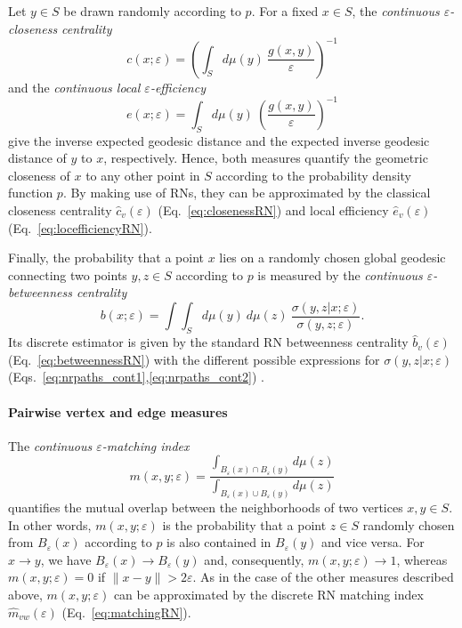 Let $y\in S$ be drawn randomly according to $p$. For a fixed $x\in S$, the \emph{continuous $\varepsilon$-closeness centrality}
\begin{equation}
c(x;\varepsilon)=\left(\int_S d\mu(y)\ \frac{g(x,y)}{\varepsilon}\right)^{-1}
\end{equation}
\noindent
and the \emph{continuous local $\varepsilon$-efficiency} 
\begin{equation}
e(x;\varepsilon)=\int_S d\mu(y)\ \left(\frac{g(x,y)}{\varepsilon}\right)^{-1}
\end{equation}
\noindent
give the inverse expected geodesic distance and the expected inverse geodesic distance of $y$ to $x$, respectively. Hence, both measures quantify the geometric closeness of $x$ to any other point in $S$ according to the probability density function $p$. By making use of RNs, they can be approximated by the classical closeness centrality $\hat{c}_v(\varepsilon)$ (Eq.~\ref{eq:closenessRN}) and local efficiency $\hat{e}_v(\varepsilon)$ (Eq.~\ref{eq:locefficiencyRN}).

Finally, the probability that a point $x$ lies on a randomly chosen global geodesic connecting two points $y,z\in S$ according to $p$ is measured by the \emph{continuous $\varepsilon$-betweenness centrality}
\begin{equation}
b(x;\varepsilon)=\int\int_S d\mu(y)\ d\mu(z)\ \frac{\sigma(y,z|x;\varepsilon)}{\sigma(y,z;\varepsilon)}.
\end{equation}
\noindent
Its discrete estimator is given by the standard RN betweenness centrality $\hat{b}_v(\varepsilon)$ (Eq.~\ref{eq:betweennessRN}) with the different possible expressions for $\sigma(y,z|x;\varepsilon)$ (Eqs.~\ref{eq:nrpaths_cont1},\ref{eq:nrpaths_cont2}) \cite{Donges2012}.


\paragraph{Pairwise vertex and edge measures}

The \emph{continuous $\varepsilon$-matching index}
\begin{equation}
m(x,y;\varepsilon)=\frac{\int_{B_{\varepsilon}(x)\cap B_{\varepsilon}(y)}d\mu(z)}{\int_{B_{\varepsilon}(x)\cup B_{\varepsilon}(y)}d\mu(z)}
\end{equation}
\noindent
quantifies the mutual overlap between the neighborhoods of two vertices $x,y\in S$. In other words, $m(x,y;\varepsilon)$ is the probability that a point $z\in S$ randomly chosen from $B_{\varepsilon}(x)$ according to $p$ is also contained in $B_{\varepsilon}(y)$ and vice versa. For $x\to y$, we have $B_{\varepsilon}(x)\to B_{\varepsilon}(y)$ and, consequently, $m(x,y;\varepsilon)\to 1$, whereas $m(x,y;\varepsilon)=0$ if $\|x-y\|>2\varepsilon$. As in the case of the other measures described above, $m(x,y;\varepsilon)$ can be approximated by the discrete RN matching index $\hat{m}_{vw}(\varepsilon)$ (Eq.~\ref{eq:matchingRN}).

